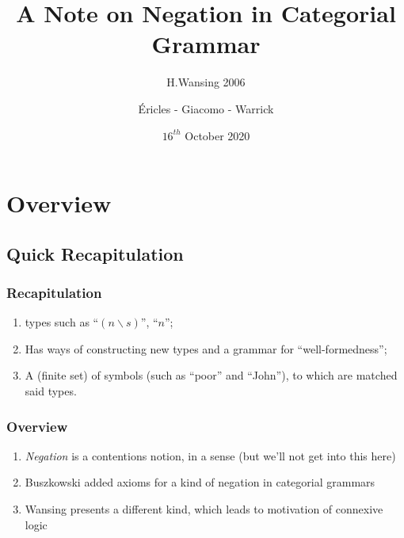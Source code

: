 \documentclass{beamer}
\title{A Note on Negation in Categorial Grammar}
\subtitle{H.Wansing 2006}
\author{Éricles - Giacomo - Warrick}
\date{$16^{th}$ October 2020}
\begin{document}
\begin{frame}
  \titlepage
\end{frame}



\section{Overview}

\subsection{Quick Recapitulation}
\begin{frame}
\frametitle{Recapitulation}

\begin{enumerate}
\item types such as ``$(n \backslash s)$'', ``$n$'';
\item Has ways of constructing new types and a grammar for
  ``well-formedness'';
\item A (finite set) of symbols (such as ``poor'' and ``John''), to
  which are matched said types.
\end{enumerate}
\end{frame}

\begin{frame}[fragile]
\begin{center}
\end{center}
\end{frame}



  




\begin{frame}
  \frametitle{Overview}

\begin{enumerate}
\item \textit{Negation} is a contentions notion, in a sense (but we'll
  not get into this here)
\item Buszkowski added axioms for a kind of negation in categorial
  grammars
\item Wansing presents a different kind, which leads to motivation
  of connexive logic
\end{enumerate}
\end{frame}
\end{document}
